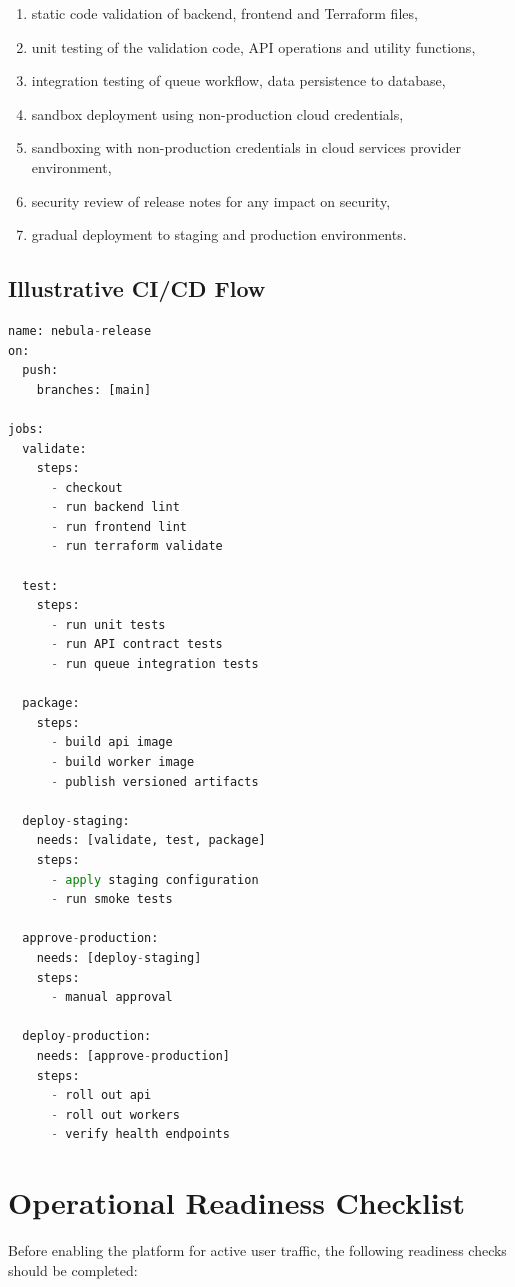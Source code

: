 \begin{enumerate}
    \item static code validation of backend, frontend and Terraform files,
    \item unit testing of the validation code, API operations and utility functions,
    \item integration testing of queue workflow, data persistence to database,
    \item sandbox deployment using non-production cloud credentials,
    \item sandboxing with non-production credentials in cloud services provider environment,
    \item security review of release notes for any impact on security,
    \item gradual deployment to staging and production environments.
\end{enumerate}

\subsection{Illustrative CI/CD Flow}
\begin{lstlisting}[language=Python, caption=Release Pipeline Stages in Pseudo Workflow Form]
name: nebula-release
on:
  push:
    branches: [main]

jobs:
  validate:
    steps:
      - checkout
      - run backend lint
      - run frontend lint
      - run terraform validate

  test:
    steps:
      - run unit tests
      - run API contract tests
      - run queue integration tests

  package:
    steps:
      - build api image
      - build worker image
      - publish versioned artifacts

  deploy-staging:
    needs: [validate, test, package]
    steps:
      - apply staging configuration
      - run smoke tests

  approve-production:
    needs: [deploy-staging]
    steps:
      - manual approval

  deploy-production:
    needs: [approve-production]
    steps:
      - roll out api
      - roll out workers
      - verify health endpoints
\end{lstlisting}

\section{Operational Readiness Checklist}
Before enabling the platform for active user traffic, the following readiness checks should be completed:

